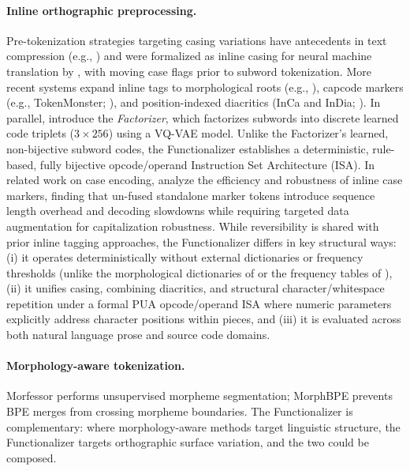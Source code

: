 \documentclass{article}
\begin{document}
\paragraph{Inline orthographic preprocessing.} Pre-tokenization strategies targeting casing variations have antecedents in text compression (e.g., \citealp{rexline2011}) and were formalized as inline casing for neural machine translation by \citet{berard2019}, with \citet{etchegoyhen2020} moving case flags prior to subword tokenization. More recent systems expand inline tags to morphological roots (e.g., \citealp{bayram2025}), capcode markers (e.g., TokenMonster; \citealp{forsythe2023}), and position-indexed diacritics (InCa and InDia; \citealp{semenov2025}). In parallel, \citet{samuel2023} introduce the \emph{Factorizer}, which factorizes subwords into discrete learned code triplets ($3 \times 256$) using a VQ-VAE model. Unlike the Factorizer's learned, non-bijective subword codes, the Functionalizer establishes a deterministic, rule-based, fully bijective opcode/operand Instruction Set Architecture (ISA). In related work on case encoding, \citet{jain2023} analyze the efficiency and robustness of inline case markers, finding that un-fused standalone marker tokens introduce sequence length overhead and decoding slowdowns while requiring targeted data augmentation for capitalization robustness. While reversibility is shared with prior inline tagging approaches, the Functionalizer differs in key structural ways: (i) it operates deterministically without external dictionaries or frequency thresholds (unlike the morphological dictionaries of \citet{bayram2025} or the frequency tables of \citet{semenov2025}), (ii) it unifies casing, combining diacritics, and structural character/whitespace repetition under a formal PUA opcode/operand ISA where numeric parameters explicitly address character positions within pieces, and (iii) it is evaluated across both natural language prose and source code domains.

\paragraph{Morphology-aware tokenization.} Morfessor \citep{creutz2002,creutz2007} performs unsupervised morpheme segmentation; MorphBPE \citep{asgari2025} prevents BPE merges from crossing morpheme boundaries. The Functionalizer is complementary: where morphology-aware methods target linguistic structure, the Functionalizer targets orthographic surface variation, and the two could be composed.
\end{document}
